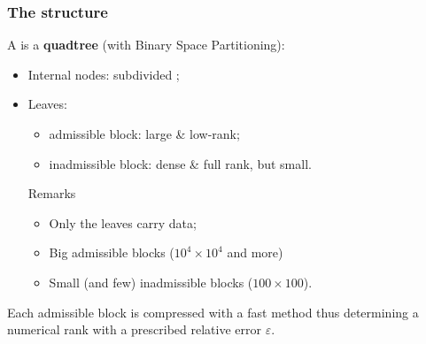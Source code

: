 \begin{frame}
\frametitle{The \hmat structure}

A \hmat  is a \textbf{quadtree} (with Binary Space Partitioning):
\begin{itemize}
\item Internal nodes: subdivided \hmat; 
\item Leaves:
\begin{itemize}
\item admissible block: large \& low-rank;
\item inadmissible block: dense \& full rank, but small.
\end{itemize}

\begin{block}{Remarks}
\begin{itemize}
\item Only the leaves carry data; 
\item Big admissible blocks ($10^4 \times 10^4$ and more)
\item Small (and few) inadmissible blocks ($100 \times 100$).
\end{itemize}
\end{block}

\end{itemize}

Each admissible block is compressed with a fast method thus determining a numerical rank with  a prescribed relative error {$\varepsilon$}.

\end{frame}

